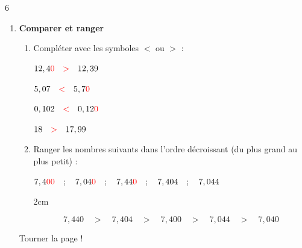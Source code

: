 \documentclass[a4paper]{book}
\begin{document}
{    \begin{exerciceNote}{6}
        \begin{enumerate}[leftmargin=*]
            \item \textbf{Comparer et ranger}

            \begin{enumerate}[leftmargin=*]
                \item Compléter avec les symboles $<$ ou $>$ :
                
                    \begin{minipage}{0.45\linewidth}
                        $12,4\textcolor{red}{0} \quad \textcolor{red}{>} \quad 12,39$

                        \medskip
                        
                        $5,07 \quad \textcolor{red}{<} \quad 5,7\textcolor{red}{0}$
                    \end{minipage}
                    \hfill \vline \hfill
                    \begin{minipage}{0.45\linewidth}
                        $0,102 \quad \textcolor{red}{<} \quad 0,12\textcolor{red}{0}$

                        \medskip
                        
                        $18 \quad \textcolor{red}{>} \quad 17,99$
                    \end{minipage}

                \medskip

                \item Ranger les nombres suivants dans l'ordre décroissant (du plus grand au plus petit) :
                \begin{center}
                    $7,4\textcolor{red}{00} \quad ; \quad 7,04\textcolor{red}{0} \quad ; \quad 7,44\textcolor{red}{0} \quad ; \quad 7,404 \quad ; \quad 7,044$
                \end{center}
                
                \begin{ZoneReponse}{2cm}

                \[ 7,440 \quad > \quad 7,404 \quad > \quad 7,400 \quad > \quad 7,044 \quad > \quad 7,040 \]
                \end{ZoneReponse}
            \end{enumerate}


\vfill \hfill Tourner la page !

\newpage
          

\end{enumerate}
\end{exerciceNote}}
\end{document}
